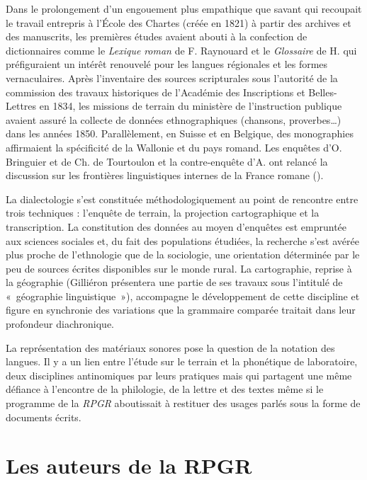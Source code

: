 \documentclass[output=paper]{langsci/langscibook}
\begin{document}
 Dans le prolongement d’un engouement plus empathique que savant qui recoupait le travail entrepris à l’École des Chartes (créée en 1821) à partir des archives et des manuscrits, les premières études avaient abouti à la confection de dictionnaires comme le \textit{Lexique} \textit{roman} \citeyear{raynouard_lexique_1838} de F. Raynouard et le \textit{Glossaire} de H. \citet{jaubert_glossaire_1856} qui préfiguraient un intérêt renouvelé pour les langues régionales et les formes vernaculaires. Après l’inventaire des sources scripturales sous l’autorité de la commission des travaux historiques de l’Académie des Inscriptions et Belles-Lettres en 1834, les missions de terrain du ministère de l’instruction publique avaient assuré la collecte de données ethnographiques (chansons, proverbes…) dans les années 1850. Parallèlement, en Suisse et en Belgique, des monographies affirmaient la spécificité de la Wallonie et du pays romand. Les enquêtes d’O. Bringuier et de Ch. de Tourtoulon \citeyear{tourtoulon_etude_1876} et la contre-enquête d’A. \citet{thomas_rapport_1879} ont relancé la discussion sur les frontières linguistiques internes de la France romane (\citealt{brun-trigaud_croissant_1990}).

La dialectologie s’est constituée méthodologiquement au point de rencontre entre trois techniques : l’enquête de terrain, la projection cartographique et la transcription. La constitution des données au moyen d’enquêtes est empruntée aux sciences sociales et, du fait des populations étudiées, la recherche s’est avérée plus proche de l’ethnologie que de la sociologie, une orientation déterminée par le peu de sources écrites disponibles sur le monde rural. La cartographie, reprise à la géographie (Gilliéron présentera une partie de ses travaux sous l’intitulé de «~géographie linguistique~»), accompagne le développement de cette discipline et figure en synchronie des variations que la grammaire comparée traitait dans leur profondeur diachronique. 

La représentation des matériaux sonores pose la question de la notation des langues. Il y a un lien entre l’étude sur le terrain et la phonétique de laboratoire, deux disciplines antinomiques par leurs pratiques mais qui partagent une même défiance à l’encontre de la philologie, de la lettre et des textes même si le programme de la \textit{RPGR} aboutissait à restituer des usages parlés sous la forme de documents écrits. 

\section{Les auteurs de la RPGR} 
\end{document}
